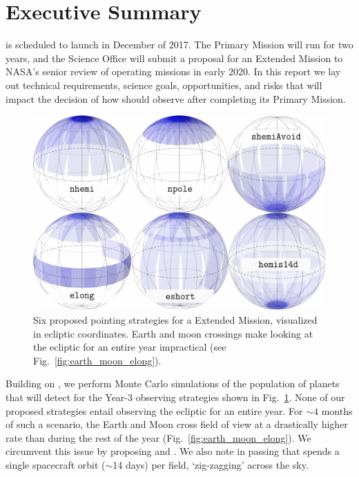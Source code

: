\newpage
\section{Executive Summary}

\tess is scheduled to launch in December of 2017.
The Primary Mission will run for two years, and the \tess Science
Office will submit a proposal for an Extended Mission to NASA's senior
review of operating missions in early 2020.  In this report we lay out
technical requirements, science goals, opportunities, and risks that
will impact the decision of how \tess should observe after completing
its Primary Mission.

\begin{figure}[!b]
	\includegraphics{figures/proposed_pointings_texttt.pdf}
	\caption{Six proposed pointing strategies for a \tess Extended Mission, visualized in ecliptic coordinates.
	Earth and moon crossings make looking at the ecliptic for an entire year impractical (see Fig.~\protect\ref{fig:earth_moon_elong}).}
	\label{fig:strategies}
\end{figure}

Building on \citet{Sullivan_2015}, we perform Monte Carlo simulations of the population of planets that \tess will detect for the Year-3 observing strategies shown in Fig.~\ref{fig:strategies}.
None of our proposed strategies entail observing the ecliptic for an entire year.
For $\sim\!4$ months of such a scenario, the Earth and Moon cross \tesss field of view at a drastically higher rate than during the rest of the year (Fig.~\ref{fig:earth_moon_elong}).
We circumvent this issue by proposing \elong\:and \eshort.
We also note in passing that \hemis\:spends a single spacecraft orbit ($\sim$14 days) per field, `zig-zagging' across the sky.


